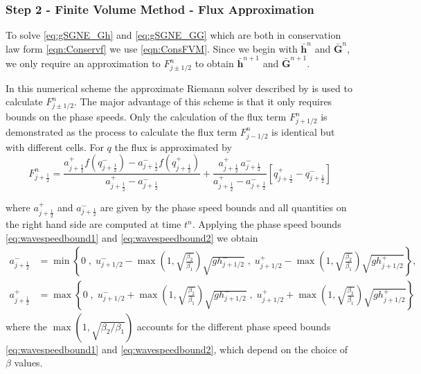 \documentclass[10pt]{elsarticle}
\newcommand{\vecn}[1]{\boldsymbol{#1}}
\begin{document}
\subsubsection{Step 2 -  Finite Volume Method - Flux Approximation}
To solve \eqref{eq:gSGNE_Gh} and \eqref{eq:gSGNE_GG} which are both in conservation law form \eqref{eqn:Conservf} we use \eqref{eqn:ConsFVM}. Since we begin with $\bar{\vecn{h}}^n$ and $\bar{\vecn{G}}^n$, we only require an approximation to $F^n_{j\pm1/2}$ to obtain $\bar{\vecn{h}}^{n+1}$ and $\bar{\vecn{G}}^{n+1}$.

In this numerical scheme the approximate Riemann solver described by \citet{Kurganov-etal-2001-707} is used to calculate $F^n_{j\pm1/2}$. The major advantage of this scheme is that it only requires bounds on the phase speeds. Only the calculation of the flux term $F^n_{j+1/2}$ is demonstrated as the process to calculate the flux term $F^n_{j-1/2}$ is identical but with different cells. For $q$ the flux is approximated by
\begin{equation}\label{eqn:HLL_flux}
F^n_{j+\frac{1}{2}} = \dfrac{a^+_{j+\frac{1}{2}} f\left(q^-_{j+\frac{1}{2}}\right) - a^-_{j+\frac{1}{2}} f\left(q^+_{j+\frac{1}{2}}\right)}{a^+_{j+\frac{1}{2}} - a^-_{j+\frac{1}{2}}}  + \dfrac{a^+_{j+\frac{1}{2}} \, a^-_{j+\frac{1}{2}}}{a^+_{j+\frac{1}{2}} - a^-_{j+\frac{1}{2}}} \left [ q^+_{j+\frac{1}{2}} - q^-_{j+\frac{1}{2}} \right ]
\end{equation}

where $a^+_{j+\frac{1}{2}}$ and $a^-_{j+\frac{1}{2}}$ are given by the phase speed bounds and all quantities on the right hand side are computed at time $t^n$. Applying the phase speed bounds \eqref{eq:wavespeedbound1} and \eqref{eq:wavespeedbound2} we obtain
\begin{align}
a^-_{j+\frac{1}{2}} &= \min\left\lbrace 0\;,\;  u^-_{j + 1/2} - \max{\left(1 , \sqrt{\frac{\beta_2}{\beta_1}}\right)} \sqrt{g h^-_{j + 1/2}}  \;,\;u^+_{j + 1/2} -\max{\left(1 , \sqrt{\frac{\beta_2}{\beta_1}}\right)} \sqrt{g h^+_{j + 1/2}} \right\rbrace  ,\\
a^+_{j+\frac{1}{2}} &= \max\left\lbrace 0 \;,\;  u^-_{j + 1/2} + \max{\left(1 , \sqrt{\frac{\beta_2}{\beta_1}}\right)}\sqrt{g h^-_{j + 1/2}}  \;,\;u^+_{j + 1/2} + \max{\left(1 , \sqrt{\frac{\beta_2}{\beta_1}}\right)}\sqrt{g h^+_{j + 1/2}} \right\rbrace
\label{eqn:WaveSpeedBoundsFluxApprox}
\end{align}
where the $\max{\left(1 , \sqrt{{\beta_2}/{\beta_1}}\right)}$ accounts for the different phase speed bounds  \eqref{eq:wavespeedbound1} and \eqref{eq:wavespeedbound2}, which depend on the choice of $\beta$ values. 
\end{document}
